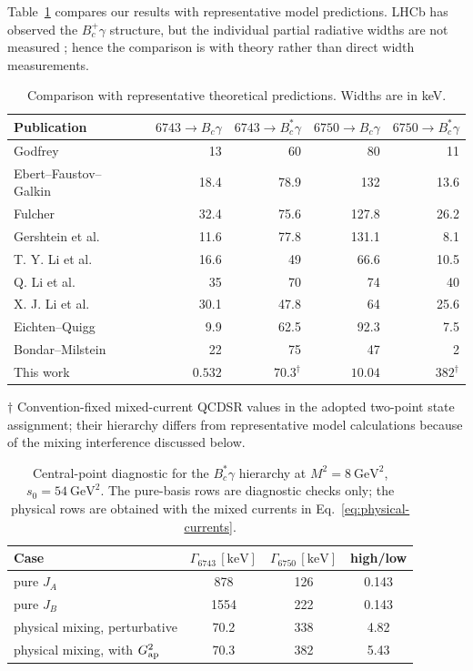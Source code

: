 \documentclass[aps,prd,preprint,nofootinbib,superscriptaddress]{revtex4-2}
\newcommand{\Bc}{B_c}
\newcommand{\Bcst}{B_c^\ast}
\newcommand{\GeV}{\mathrm{GeV}}
\newcommand{\keV}{\mathrm{keV}}
\begin{document}
Table~\ref{tab:comparison} compares our results with representative model
predictions.  LHCb has observed the \(B_c^+\gamma\) structure, but the
individual partial radiative widths are not measured
\cite{LHCbBc1PObservation2025,LHCbBc1PStudy2025}; hence the comparison is with
theory rather than direct width measurements.

\begin{table}[t]
\centering
\caption{Comparison with representative theoretical predictions.  Widths are
in keV.}
\scriptsize
\setlength{\tabcolsep}{3pt}
\begin{tabular}{lrrrr}
\toprule
Publication
& \(6743\to \Bc\gamma\)
& \(6743\to \Bcst\gamma\)
& \(6750\to \Bc\gamma\)
& \(6750\to \Bcst\gamma\)\\
\midrule
Godfrey~\cite{Godfrey2004} & 13 & 60 & 80 & 11\\
Ebert--Faustov--Galkin~\cite{Ebert2003} & 18.4 & 78.9 & 132 & 13.6\\
Fulcher~\cite{Fulcher1999} & 32.4 & 75.6 & 127.8 & 26.2\\
Gershtein et al.~\cite{Gershtein1995} & 11.6 & 77.8 & 131.1 & 8.1\\
T. Y. Li et al.~\cite{LiTang2023} & 16.6 & 49 & 66.6 & 10.5\\
Q. Li et al.~\cite{LiZhong2019} & 35 & 70 & 74 & 40\\
X. J. Li et al.~\cite{LiLiu2023} & 30.1 & 47.8 & 64 & 25.6\\
Eichten--Quigg~\cite{EichtenQuigg2018} & 9.9 & 62.5 & 92.3 & 7.5\\
Bondar--Milstein~\cite{BondarMilstein2025} & 22 & 75 & 47 & 2\\
This work & \(0.532\) & \(70.3^\dagger\) & \(10.04\) & \(382^\dagger\)\\
\bottomrule
\end{tabular}
\label{tab:comparison}
\end{table}
\noindent\(\dagger\) Convention-fixed mixed-current QCDSR values in the
adopted two-point state assignment; their hierarchy differs from representative
model calculations because of the mixing interference discussed below.

\begin{table}[t]
\centering
\caption{Central-point diagnostic for the \(B_c^\ast\gamma\) hierarchy at
\(M^2=8~\GeV^2\), \(s_0=54~\GeV^2\).  The pure-basis rows are diagnostic
checks only; the physical rows are obtained with the mixed currents in
Eq.~\eqref{eq:physical-currents}.}
\begin{tabular}{lccc}
\toprule
Case & \(\Gamma_{6743}\,[\keV]\) & \(\Gamma_{6750}\,[\keV]\) & high/low\\
\midrule
pure \(J_A\) & 878 & 126 & 0.143\\
pure \(J_B\) & 1554 & 222 & 0.143\\
physical mixing, perturbative & 70.2 & 338 & 4.82\\
physical mixing, with \(G^2_{\rm ap}\) & 70.3 & 382 & 5.43\\
\bottomrule
\end{tabular}
\label{tab:interference-diagnostic}
\end{table}
\end{document}
